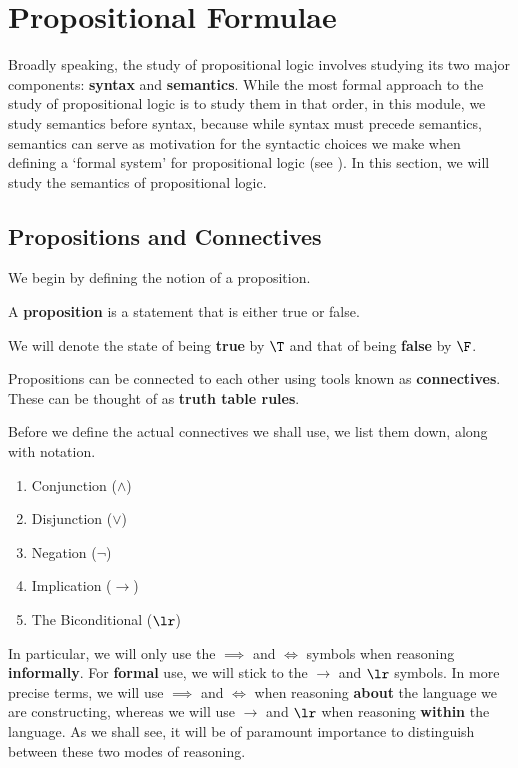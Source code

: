 \section{Propositional Formulae}

Broadly speaking, the study of propositional logic involves studying its two major components: \textbf{syntax} and \textbf{semantics}. While the most formal approach to the study of propositional logic is to study them in that order, in this module, we study semantics before syntax, because while syntax must precede semantics, semantics can serve as motivation for the syntactic choices we make when defining a `formal system' for propositional logic (see ). In this section, we will study the semantics of propositional logic.

\subsection{Propositions and Connectives}

We begin by defining the notion of a proposition.

\begin{boxdefinition}[Proposition]
    A \textbf{proposition} is a statement that is either true or false.
\end{boxdefinition}

\begin{boxconvention}
    We will denote the state of being \textbf{true} by $\T$ and that of being \textbf{false} by $\F$.
\end{boxconvention}

Propositions can be connected to each other using tools known as \textbf{connectives}. These can be thought of as \textbf{truth table rules}.

\begin{boxconvention}
    Before we define the actual connectives we shall use, we list them down, along with notation.
    \begin{enumerate}[noitemsep]
        \item Conjunction ($\land$)
        \item Disjunction ($\lor$)
        \item Negation ($\neg$)
        \item Implication ($\to$)
        \item The Biconditional ($\lr$)
    \end{enumerate}
    In particular, we will only use the $\implies$ and $\iff$ symbols when reasoning \textbf{informally}. For \textbf{formal} use, we will stick to the $\to$ and $\lr$ symbols. In more precise terms, we will use $\implies$ and $\iff$ when reasoning \textbf{about} the language we are constructing, whereas we will use $\to$ and $\lr$ when reasoning \textbf{within} the language. As we shall see, it will be of paramount importance to distinguish between these two modes of reasoning.
\end{boxconvention}

